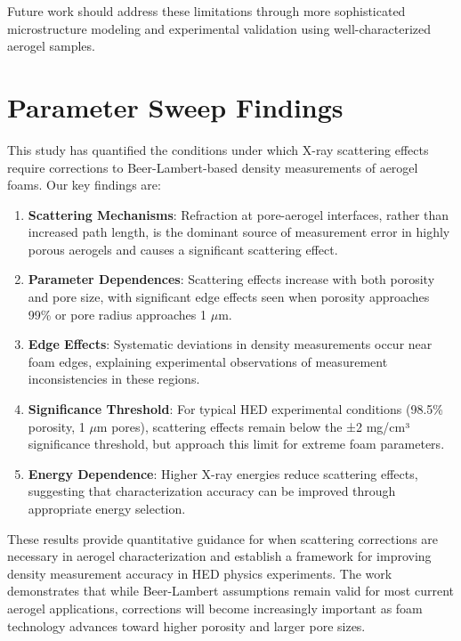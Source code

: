 \documentclass[twocolumn]{aastex701}
\begin{document}
Future work should address these limitations through more sophisticated microstructure modeling and experimental validation using well-characterized aerogel samples.

\section{Parameter Sweep Findings}

This study has quantified the conditions under which X-ray scattering effects require corrections to Beer-Lambert-based density measurements of aerogel foams. Our key findings are:

\begin{enumerate}
    \item \textbf{Scattering Mechanisms}: Refraction at pore-aerogel interfaces, rather than increased path length, is the dominant source of measurement error in highly porous aerogels and causes a significant scattering effect.
    
    \item \textbf{Parameter Dependences}: Scattering effects increase with both porosity and pore size, with significant edge effects seen when porosity approaches 99\% or pore radius approaches 1 $\mu$m. 
    
    \item \textbf{Edge Effects}: Systematic deviations in density measurements occur near foam edges, explaining experimental observations of measurement inconsistencies in these regions.
    
    \item \textbf{Significance Threshold}: For typical HED experimental conditions (98.5\% porosity, 1 $\mu$m pores), scattering effects remain below the ±2 mg/cm³ significance threshold, but approach this limit for extreme foam parameters.
    
    \item \textbf{Energy Dependence}: Higher X-ray energies reduce scattering effects, suggesting that characterization accuracy can be improved through appropriate energy selection.
\end{enumerate}

These results provide quantitative guidance for when scattering corrections are necessary in aerogel characterization and establish a framework for improving density measurement accuracy in HED physics experiments. The work demonstrates that while Beer-Lambert assumptions remain valid for most current aerogel applications, corrections will become increasingly important as foam technology advances toward higher porosity and larger pore sizes.
\end{document}
